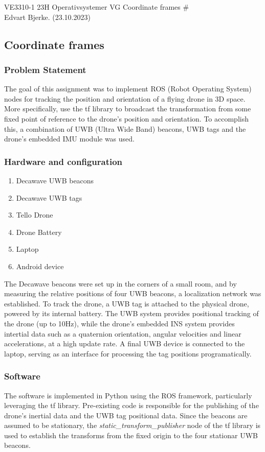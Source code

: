 \documentclass[12pt]{article}
\begin{document}
\noindent VE3310-1 23H Operativsystemer VG \hfill Coordinate frames \#\\
Edvart Bjerke. (23.10.2023)

\hrulefill

\subsection*{Coordinate frames}
\subsubsection*{Problem Statement}

The goal of this assignment was to implement ROS (Robot Operating System) nodes 
for tracking the position and orientation of a flying drone in 3D space. More specifically, use the tf 
library to broadcast the transformation from some fixed point of reference to the drone's position and orientation.
To accomplish this, a combination of UWB (Ultra Wide Band) beacons, UWB tags and the drone's embedded IMU module was used.

\subsubsection*{Hardware and configuration}
\begin{enumerate}
    \item Decawave UWB beacons
    \item Decawave UWB tags
    \item Tello Drone
    \item Drone Battery
    \item Laptop
    \item Android device
\end{enumerate}

The Decawave beacons were set up in the corners of a small room, and by measuring the relative positions of four UWB beacons, a localization network was established. To track the drone, a UWB tag is attached to the physical drone, powered by its internal battery.
The UWB system provides positional tracking of the drone (up to 10Hz), while the drone's embedded INS system provides intertial data such as a quaternion orientation, angular velocities and linear accelerations, at a high update rate.
A final UWB device is connected to the laptop, serving as an interface for processing the tag positions programatically.

\subsubsection*{Software}
The software is implemented in Python using the ROS framework, particularly leveraging the tf library. Pre-existing code is responsible for the publishing of the drone's inertial data and the UWB tag positional data.
Since the beacons are assumed to be stationary, the \textit{static\_transform\_publisher} node of the tf library is used to establish the transforms from the fixed origin to the four stationar UWB beacons. 
\\
\end{document}
